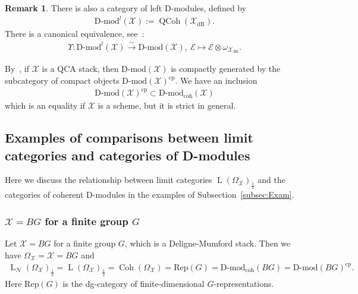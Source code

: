 \documentclass [11pt,oneside,a4paper,mathscr]{amsart}
\theoremstyle{definition}
\newtheorem{remark}[thm]{Remark}
\newcommand{\LL}{\operatorname{L}}
\newcommand{\QCoh}{\operatorname{QCoh}}
\newcommand{\X}{\mathcal{X}}
\newcommand{\Coh}{\operatorname{Coh}}
\begin{document}
\begin{remark}\label{rmk:D-mod3}
There is also a category of left D-modules, defined by 
\begin{align*}
    \text{D-mod}^l(\mathcal{X}):=\QCoh(\mathcal{X}_{\mathrm{dR}}). 
\end{align*}
There is a canonical equivalence, see~\cite{MR3701353}:
\begin{align}\label{equiv:rl}
    \Upsilon \colon \text{D-mod}^l(\mathcal{X}) \stackrel{\sim}{\to} 
    \text{D-mod}(\mathcal{X}), \ \mathcal{E} \mapsto \mathcal{E}\otimes \omega_{\mathcal{X}_{\mathrm{dR}}}. 
\end{align}
\end{remark}
By~\cite[Theorem~8.1]{MR3037900}, if $\X$ is a QCA stack, then $\text{D-mod}(\X)$ is compactly 
generated by the subcategory of compact objects $\text{D-mod}(\X)^{\mathrm{cp}}$. 
We have an inclusion
\begin{align*}
    \text{D-mod}(\X)^{\mathrm{cp}} \subset \text{D-mod}_{\mathrm{coh}}(\X)
\end{align*}
which is an equality if $\X$ is a scheme, but it is strict in general. 

\subsection{Examples of comparisons between limit categories and categories of D-modules}\label{subsec:exam}

Here we discuss the relationship between limit categories 
$\LL(\Omega_{\X})_{\frac{1}{2}}$
and 
the categories of coherent D-modules in the examples of Subsection~\ref{subsec:Exam}. 
\subsubsection{$\X=BG$ for a finite group $G$}
Let $\X=BG$ for a finite group $G$, which is a Deligne-Mumford stack. 
Then we have $\Omega_{\X}=\X=BG$ and 
\begin{align*}
\LL_{\mathcal{N}}(\Omega_{\X})_{\frac{1}{2}}=
    \LL(\Omega_{\X})_{\frac{1}{2}}=\Coh(\Omega_{\X})=\mathrm{Rep}(G)=
    \text{D-mod}_{\mathrm{coh}}(BG)=\text{D-mod}(BG)^{\mathrm{cp}}.
\end{align*}
Here $\mathrm{Rep}(G)$ is the dg-category of finite-dimensional $G$-representations. 
\end{document}
